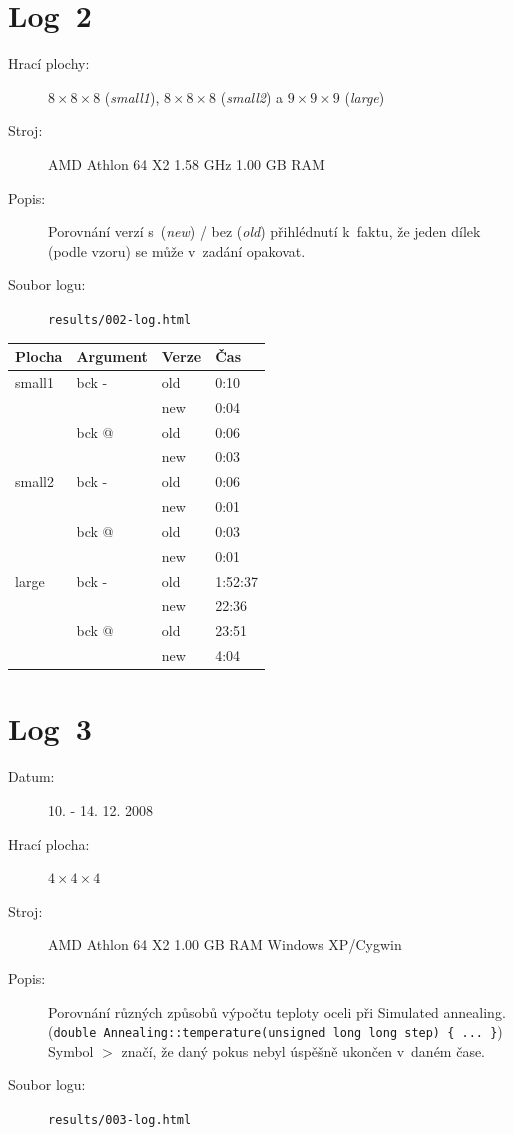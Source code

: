 \documentclass[11pt, titlepage]{report}
\begin{document}
\newpage

\section{Log~2}
\label{log2}

\begin{description}
\item[Hrací plochy:] $8 \times 8 \times 8$ (\emph{small1}), $8 \times 8 \times 8$ (\emph{small2}) a $9 \times 9 \times 9$ (\emph{large})
\item[Stroj:] AMD Athlon 64 X2 1.58 GHz 1.00 GB RAM
\item[Popis:] Porovnání verzí s~(\emph{new}) / bez (\emph{old}) přihlédnutí k~faktu, že jeden dílek (podle vzoru) se může v~zadání opakovat.
\item[Soubor logu:] \texttt{results/002-log.html}
\end{description}

\begin{tabular}{|l|l|l|l|}
\hline
\textbf{Plocha} & \textbf{Argument} & \textbf{Verze} & \textbf{Čas} \\
\hline
small1 & bck - & old & 0:10 \\
& & new & 0:04 \\
& bck @ & old & 0:06 \\
& & new & 0:03 \\
small2 & bck - & old & 0:06 \\
& & new & 0:01 \\
& bck @ & old & 0:03 \\
& & new & 0:01 \\
large & bck - & old & 1:52:37 \\
& & new & 22:36 \\
& bck @ & old & 23:51 \\
& & new & 4:04 \\
\hline
\end{tabular}

\newpage

\section{Log~3}
\label{log3}

\begin{description}
\item[Datum:] 10. - 14. 12. 2008
\item[Hrací plocha:] $4 \times 4 \times 4$
\item[Stroj:] AMD Athlon 64 X2 1.00 GB RAM Windows XP/Cygwin
\item[Popis:] Porovnání různých způsobů výpočtu teploty oceli při Simulated annealing. (\verb=double Annealing::temperature(unsigned long long step) { ... }=) Symbol $>$ značí, že daný pokus nebyl úspěšně ukončen v~daném čase.
\item[Soubor logu:] \texttt{results/003-log.html}
\end{description}
\end{document}

